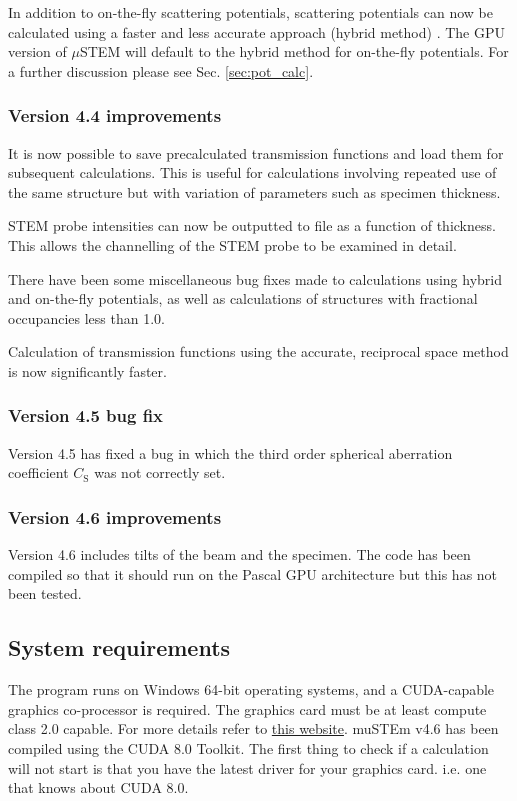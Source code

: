 \documentclass[12pt,a4paper]{article}
\begin{document}
In addition to on-the-fly scattering potentials, scattering potentials can now be calculated using a faster and less accurate approach (hybrid method) \cite{VDB}.
The GPU version of $\mu$STEM will default to the hybrid method for on-the-fly potentials.
For a further discussion please see Sec. \ref{sec:pot_calc}. 

\subsubsection{Version 4.4 improvements}

It is now possible to save precalculated transmission functions and load them for subsequent calculations.
This is useful for calculations involving repeated use of the same structure but with variation of parameters such as specimen thickness.

STEM probe intensities can now be outputted to file as a function of thickness.
This allows the channelling of the STEM probe to be examined in detail.

There have been some miscellaneous bug fixes made to calculations using hybrid and on-the-fly potentials, as well as calculations of structures with fractional occupancies less than 1.0.

Calculation of transmission functions using the accurate, reciprocal space method is now significantly faster.

\subsubsection{Version 4.5 bug fix}

Version 4.5 has fixed a bug in which the third order spherical aberration coefficient $C_\text{S}$ was not correctly set.

\subsubsection{Version 4.6 improvements}

Version 4.6 includes tilts of the beam and the specimen. The code has been compiled so that it should run on the Pascal GPU architecture but this has not been tested.

\subsection{System requirements}

The program runs on Windows 64-bit operating systems, and a CUDA-capable graphics co-processor is required. The graphics card must be at least compute class 2.0 capable.
For more details refer to \href{https://developer.nvidia.com/cuda-gpus}{this website}. muSTEm v4.6 has been compiled using the CUDA 8.0 Toolkit. The first thing to check if a calculation will not start is that you have the latest driver for your graphics card. i.e. one that knows about CUDA 8.0. 
\end{document}
